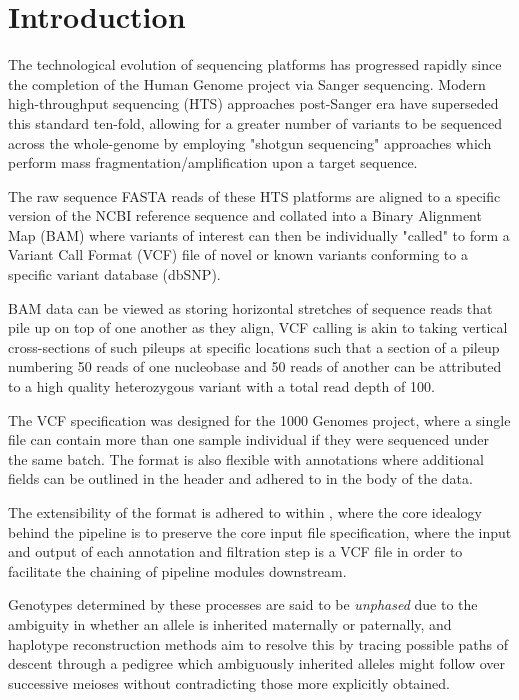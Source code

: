 
\section{Introduction}

The technological evolution of sequencing platforms has progressed rapidly since the completion of the Human Genome project via Sanger sequencing. Modern high-throughput sequencing (HTS) approaches post-Sanger era have superseded this standard ten-fold, allowing for a greater number of variants to be sequenced across the whole-genome by employing "shotgun sequencing" approaches which perform mass fragmentation/amplification upon a target sequence.

The raw sequence FASTA reads of these HTS platforms are aligned to a specific version of the NCBI reference sequence and collated into a Binary Alignment Map (BAM) where variants of interest can then be individually "called" to form a Variant Call Format (VCF) file of novel or known variants conforming to a specific variant database (dbSNP).

BAM data can be viewed as storing horizontal stretches of sequence reads that pile up on top of one another as they align, VCF calling is akin to taking vertical cross-sections of such pileups at specific locations such that a section of a pileup numbering 50 reads of one nucleobase and 50 reads of another can be attributed to a high quality heterozygous variant with a total read depth of 100.

The VCF specification was designed for the 1000 Genomes project, where a single file can contain more than one sample individual if they were  sequenced under the same batch. The format is also flexible with annotations where additional fields can be outlined in the header and adhered to in the body of the data. 

The extensibility of the format is adhered to within \app, where the core idealogy behind the pipeline is to preserve the core input file specification, where the input and output of each annotation and filtration step is a VCF file in order to facilitate the chaining of pipeline modules downstream. 




Genotypes determined by these processes are said to be \textit{unphased} due to the ambiguity in whether an allele is inherited maternally or paternally, and haplotype reconstruction methods aim to resolve this by tracing possible paths of descent through a pedigree which ambiguously inherited alleles might follow over successive meioses without contradicting those more explicitly obtained.

